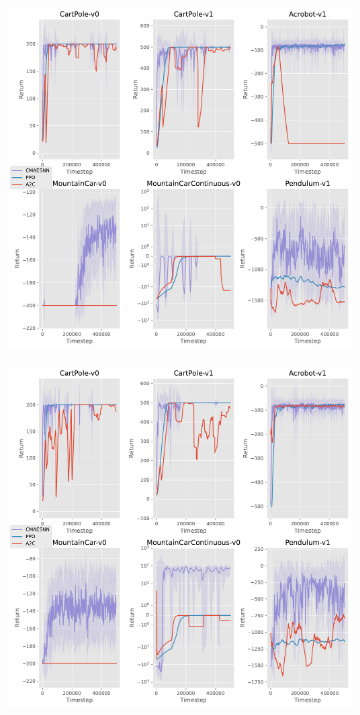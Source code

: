 \documentclass[12pt,a4paper]{article}
\begin{document}
\begin{figure}[ht!]
  \begin{subfigure}[ht!]{0.35\textwidth}
    \includegraphics[width=\textwidth]{../plotting/plots/plot_all2.pdf}
    \caption{}
  \end{subfigure}
  \hspace{0.05\textwidth}
  \begin{subfigure}[ht!]{0.35\textwidth}
    \includegraphics[width=\textwidth]{../plotting/plots/plot_all3.pdf}
    \caption{}
  \end{subfigure}


\end{figure}
\end{document}
